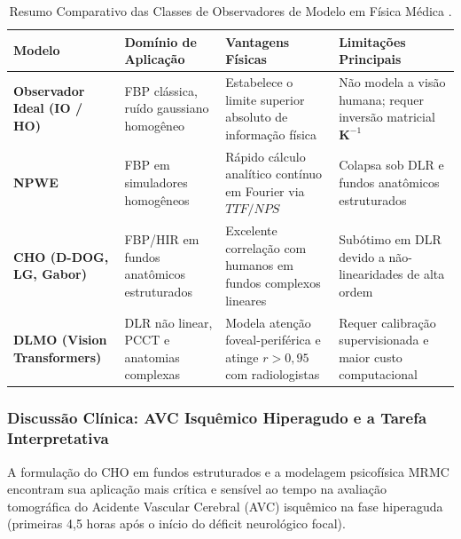 \documentclass[
  12pt,
  a4paper,
  oneside
]{report}
\begin{document}
\begin{table}[htbp]
  \centering
  \small
  \caption[Comparativo das Classes de Observadores de Modelo]{Resumo Comparativo das Classes de Observadores de Modelo em Física Médica \cite{barrett_myers_2004, burgess1994, myers_barrett_1987, toia2023, debbiche2024}.}
  \label{tab:comparativo_observadores}
  \renewcommand{\arraystretch}{1.25}
  \begin{tabularx}{\textwidth}{>{\RaggedRight\bfseries}p{} >{\RaggedRight}p{} >{\RaggedRight}p{} >{\RaggedRight\arraybackslash}X}
    \toprule
    \textbf{Modelo} & \textbf{Domínio de Aplicação} & \textbf{Vantagens Físicas} & \textbf{Limitações Principais} \\
    \midrule
    Observador Ideal (IO / HO) \cite{barrett_myers_2004, wagner1979} & FBP clássica, ruído gaussiano homogêneo & Estabelece o limite superior absoluto de informação física & Não modela a visão humana; requer inversão matricial $\mathbf{K}^{-1}$ \\
    \addlinespace[0.4em]
    NPWE \cite{burgess1994, eckstein2000} & FBP em simuladores homogêneos & Rápido cálculo analítico contínuo em Fourier via $TTF/NPS$ & Colapsa sob DLR e fundos anatômicos estruturados \\
    \addlinespace[0.4em]
    CHO (D-DOG, LG, Gabor) \cite{myers_barrett_1987, gallas2003} & FBP/HIR em fundos anatômicos estruturados & Excelente correlação com humanos em fundos complexos lineares & Subótimo em DLR devido a não-linearidades de alta ordem \\
    \addlinespace[0.4em]
    DLMO (Vision Transformers) \cite{dosovitskiy2020, toia2023, debbiche2024} & DLR não linear, PCCT e anatomias complexas & Modela atenção foveal-periférica e atinge $r > 0{,}95$ com radiologistas & Requer calibração supervisionada e maior custo computacional \\
    \bottomrule
  \end{tabularx}
  \vspace{0.3em}\par{}
\end{table}

\subsubsection{Discussão Clínica: AVC Isquêmico Hiperagudo e a Tarefa Interpretativa}
A formulação do CHO em fundos estruturados e a modelagem psicofísica MRMC encontram sua aplicação mais crítica e sensível ao tempo na avaliação tomográfica do Acidente Vascular Cerebral (AVC) isquêmico na fase hiperaguda (primeiras 4,5 horas após o início do déficit neurológico focal).
\end{document}
